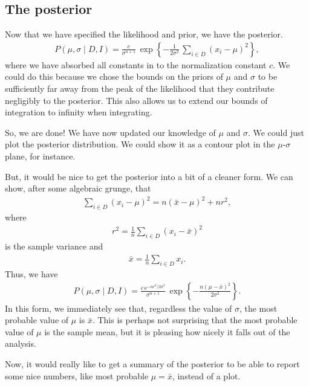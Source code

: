 \subsection{The posterior}
Now that we have specified the likelihood and prior, we have the
posterior.
\begin{align}
P(\mu, \sigma \mid D, I) = \frac{c}{\sigma^{n+1}}\,
\exp\left\{-\frac{1}{2\sigma^2}\,\sum_{i\in D} (x_i - \mu)^2\right\},
\end{align}
where we have absorbed all constants in to the normalization constant
$c$.  We could do this because we chose the bounds on the priors of
$\mu$ and $\sigma$ to be sufficiently far away from the peak of the
likelihood that they contribute negligibly to the posterior.  This
also allows us to extend our bounds of integration to infinity when
integrating.

So, we are done!  We have now updated our knowledge of $\mu$ and
$\sigma$.  We could just plot the posterior distribution.  We could
show it as a contour plot in the $\mu$-$\sigma$ plane, for instance.

But, it would be nice to get the posterior into a bit of a cleaner
form.  We can show, after some algebraic grunge, that
\begin{align}
\sum_{i\in D}(x_i - \mu)^2 = n(\bar{x} - \mu)^2 + nr^2,
\end{align}
where
\begin{align}
r^2 = \frac{1}{n}\sum_{i\in D}(x_i - \bar{x})^2
\end{align}
is the sample variance and
\begin{align}
\bar{x} = \frac{1}{n}\sum_{i\in D}x_i.
\end{align}
Thus, we have
\begin{align}
P(\mu, \sigma \mid D, I) = \frac{c\,\mathrm{e}^{-nr^2/2\sigma^2}}{\sigma^{n+1}}\, 
\exp\left\{-\frac{n(\mu - \bar{x})^2}{2\sigma^2}\right\}.
\end{align}
In this form, we immediately see that, regardless the value of
$\sigma$, the most probable value of $\mu$ is $\bar{x}$.  This is
perhaps not surprising that the most probable value of $\mu$ is the
sample mean, but it is pleasing how nicely it falls out of the
analysis.

Now, it would really like to get a summary of the posterior to be able
to report some nice numbers, like most probable $\mu = \bar{x}$,
instead of a plot.


